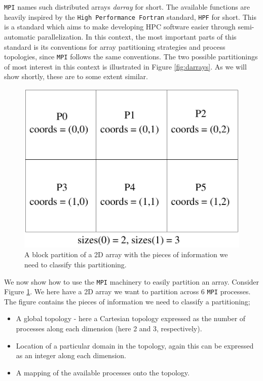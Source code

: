 \documentclass[twoside, 11pt, a4paper]{article}
\begin{document}
\texttt{MPI} names such distributed arrays \emph{darray} for short. The available
functions are heavily inspired by the \texttt{High Performance Fortran} standard,
\texttt{HPF} for short. This is a standard which aims to make developing HPC software 
easier through semi-automatic parallelization. In this context, the most important parts 
of this standard is its conventions for array partitioning 
strategies and process topologies, since \texttt{MPI} follows the same conventions.
The two possible partitionings of most interest in this context is illustrated in 
Figure \ref{fig:darrays}. As we will show shortly, these are to some extent similar.

\begin{figure}[ht]
	\begin{center}
		\includegraphics[width=12cm]{splitdomain}
	\end{center}
	\caption{A block partition of a 2D array with the pieces of information
			we need to classify this partitioning.}
	\label{fig:splitdomain}
\end{figure}
\newpage
We now show how to use the \texttt{MPI} machinery to easily partition an array.
Consider Figure \ref{fig:splitdomain}. We here have a 2D array we want to partition
across 6 \texttt{MPI} processes. The figure contains the pieces of information
we need to classify a partitioning;
\begin{itemize}
	\item A global topology - here a Cartesian topology expressed as the number 
		  of processes along each dimension (here 2 and 3, respectively).
	\item Location of a particular domain in the topology, again
		  this can be expressed as an integer along each dimension.
	\item A mapping of the available processes onto the topology.
\end{itemize}
\end{document}
